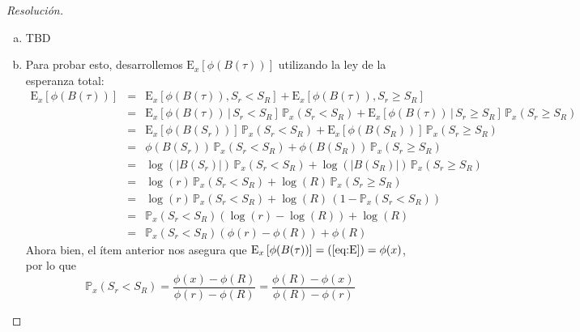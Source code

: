 \documentclass[a4paper,11pt]{article}
\newcommand{\abs}[1]{\ensuremath{\left\lvert #1 \right\rvert}}
\newcommand{\Probx}[2]{\ensuremath{\mathbb{P}_{#1} \left( #2 \right)}}
\newcommand{\Expx}[2]{\ensuremath{\textrm{E}_{#1}\left[#2\right]}}
\newcommand{\ExpxC}[3]{\ensuremath{\textrm{E}_{#1}\left[#2 \, | \, #3\right]}}
\begin{document}
\begin{proof}[Resoluci\'on]
$ $ 
\begin{enumerate}[a.]
    \item TBD
    
    \item Para probar esto, desarrollemos $\Expx{x}{\phi(B(\tau))}$ utilizando la ley
    de la esperanza total:
    \begin{eqnarray}
        \Expx{x}{\phi(B(\tau))}
            &=& \Expx{x}{\phi(B(\tau)), S_r < S_R} + 
                \Expx{x}{\phi(B(\tau)), S_r \geq S_R} \nonumber \\
            &=& \ExpxC{x}{\phi(B(\tau))}{S_r < S_R} \, \Probx{x}{S_r < S_R} +
                \ExpxC{x}{\phi(B(\tau))}{S_r \geq S_R} \, \Probx{x}{S_r \geq S_R} \nonumber \\
            &=& \Expx{x}{\phi(B(S_r))}\, \Probx{x}{S_r < S_R} +
                \Expx{x}{\phi(B(S_R))}\, \Probx{x}{S_r \geq S_R} \nonumber \\
            &=& \phi(B(S_r))\, \Probx{x}{S_r < S_R} +
                \phi(B(S_R))\, \Probx{x}{S_r \geq S_R} \nonumber \\
            &=& \log(\abs{B(S_r)})\, \Probx{x}{S_r < S_R} +
                \log(\abs{B(S_R)})\, \Probx{x}{S_r \geq S_R} \nonumber \\
            &=& \log(r)\, \Probx{x}{S_r < S_R} +
                \log(R)\, \Probx{x}{S_r \geq S_R} \nonumber \\
            &=& \log(r)\, \Probx{x}{S_r < S_R} +
                \log(R)\, (1 - \Probx{x}{S_r < S_R}) \nonumber \\
            &=& \Probx{x}{S_r < S_R} (\log(r) - \log(R)) + \log(R) \nonumber \\
            &=& \Probx{x}{S_r < S_R} (\phi(r) - \phi(R)) + \phi(R) \label{eq:E}
    \end{eqnarray}
    Ahora bien, el ítem anterior nos asegura que $\Expx{x}{\phi(B(\tau))} = (\ref{eq:E}) = \phi(x)$,
    por lo que
    $$\Probx{x}{S_r < S_R} = \frac{\phi(x) - \phi(R)}{\phi(r) - \phi(R)} 
        = \frac{\phi(R) - \phi(x)}{\phi(R) - \phi(r)}$$


\end{enumerate}
\end{proof}
\end{document}
